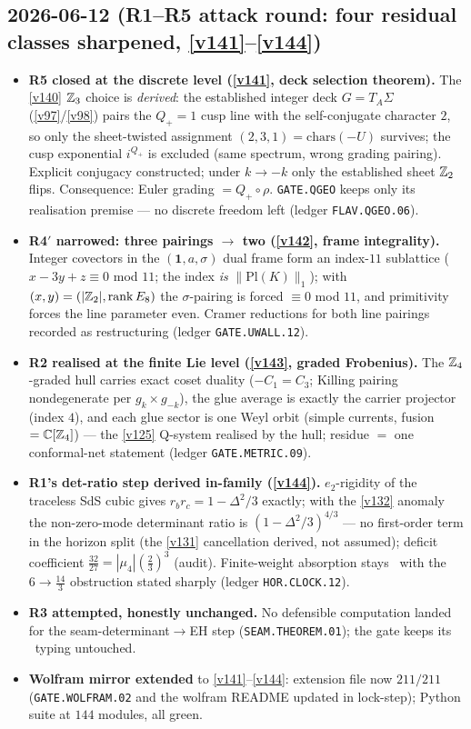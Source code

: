 \subsection*{2026-06-12 (R1--R5 attack round: four residual classes sharpened, \vref{v141}--\vref{v144})}
\begin{itemize}
\item \textbf{R5 closed at the discrete level (\vref{v141}, deck selection theorem).} The
  \vref{v140} $\mathbb{Z}_3$ choice is \emph{derived}: the established integer deck $G=T_A\Sigma$
  (\vref{v97}/\vref{v98}) pairs the $Q_+{=}1$ cusp line with the self-conjugate character
  $2$, so only the sheet-twisted assignment $(2,3,1)=\mathrm{chars}(-U)$ survives; the cusp
  exponential $i^{Q_+}$ is excluded (same spectrum, wrong grading pairing). Explicit
  conjugacy constructed; under $k\to-k$ only the established sheet $\mathbb{Z}_2$ flips.
  Consequence: Euler grading $=Q_+\!\circ\rho$. \texttt{GATE.QGEO} keeps only its
  realisation premise --- no discrete freedom left (ledger \texttt{FLAV.QGEO.06}).
\item \textbf{R4$'$ narrowed: three pairings $\to$ two (\vref{v142}, frame integrality).}
  Integer covectors in the $(\mathbf1,a,\sigma)$ dual frame form an index-$11$ sublattice
  ($x-3y+z\equiv0$ mod $11$; the index \emph{is} $\|\mathrm{Pl}(K)\|_1$); with
  $(x,y)=(|\mathbb{Z}_2|,\mathrm{rank}\,E_8)$ the $\sigma$-pairing is forced $\equiv0$ mod $11$,
  and primitivity forces the line parameter even. Cramer reductions for both line pairings
  recorded as restructuring (ledger \texttt{GATE.UWALL.12}).
\item \textbf{R2 realised at the finite Lie level (\vref{v143}, graded Frobenius).} The
  $\mathbb{Z}_4$-graded hull carries exact coset duality ($-C_1=C_3$; Killing pairing nondegenerate
  per $g_k\times g_{-k}$), the glue average is exactly the carrier projector (index $4$),
  and each glue sector is one Weyl orbit (simple currents, fusion $=\mathbb C[\mathbb{Z}_4]$) ---
  the \vref{v125} Q-system realised by the hull; residue $=$ one conformal-net statement
  (ledger \texttt{GATE.METRIC.09}).
\item \textbf{R1's det-ratio step derived in-family (\vref{v144}).} $e_2$-rigidity of the
  traceless SdS cubic gives $r_br_c=1-\Delta^2/3$ exactly; with the \vref{v132} anomaly the
  non-zero-mode determinant ratio is $(1-\Delta^2/3)^{4/3}$ --- no first-order term in the
  horizon split (the \vref{v131} cancellation derived, not assumed); deficit coefficient
  $\tfrac{32}{27}=|\mu_4|(\tfrac23)^3$ (audit). Finite-weight absorption stays \mC\ with the
  $6\to\tfrac{14}3$ obstruction stated sharply (ledger \texttt{HOR.CLOCK.12}).
\item \textbf{R3 attempted, honestly unchanged.} No defensible computation landed for the
  seam-determinant$\to$EH step (\texttt{SEAM.THEOREM.01}); the gate keeps its \mO\ typing
  untouched.
\item \textbf{Wolfram mirror extended} to \vref{v141}--\vref{v144}: extension file now
  $211/211$ (\texttt{GATE.WOLFRAM.02} and the wolfram README updated in lock-step); Python
  suite at $144$ modules, all green.
\end{itemize}

